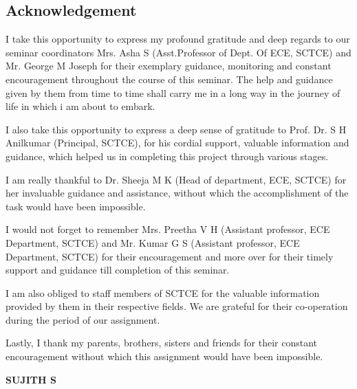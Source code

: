 \documentclass[12pt]{article}
\begin{document}
\begin{center}
\section*{\fontsize{16}{18}\selectfont Acknowledgement}
\end{center}
\vspace{10mm}
\par  I take this opportunity to express my profound gratitude and deep regards to our seminar coordinators Mrs. Asha S (Asst.Professor of Dept. Of ECE, SCTCE) and Mr. George M Joseph for their exemplary guidance, monitoring and constant encouragement throughout the course of this seminar. The help and guidance given by them from time to time shall carry me in a long way in the journey of life in which i am about to embark.\\

\par I also take this opportunity to express a deep sense of gratitude to Prof. Dr. S H Anilkumar (Principal, SCTCE), for his cordial support, valuable information and guidance, which helped us in completing this project through various stages.\\

\par I am really thankful to Dr. Sheeja M K (Head of department, ECE, SCTCE) for her invaluable guidance and assistance, without which the accomplishment of the task would have been impossible.\\

\par I would not forget to remember Mrs. Preetha V H (Assistant professor, ECE Department, SCTCE) and Mr. Kumar G S (Assistant professor, ECE Department, SCTCE) for their encouragement and more over for their timely support and guidance till completion of this seminar.\\

\par I am also obliged to staff members of SCTCE for the valuable information provided by them in their respective fields. We are grateful for their co-operation during the period of our assignment.\\

\par Lastly, I thank my parents, brothers, sisters and friends for their constant encouragement without which this assignment would have been impossible.\\
\vspace{10mm}
\begin{flushright}
\textbf{SUJITH S}
\end{flushright}
\end{document}

